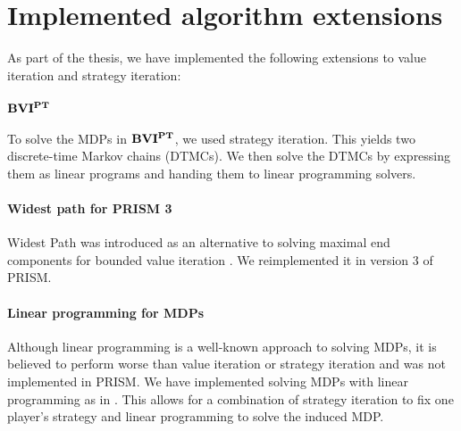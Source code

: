 \chapter{Implemented algorithm extensions} \label{ch:implementedAlgos}
As part of the thesis, we have implemented the following extensions to value iteration and strategy iteration:

\subsubsection*{$\mathbf{BVI^{PT}}$} To solve the MDPs in $\mathbf{BVI^{PT}}$, we used strategy iteration. This yields two discrete-time Markov chains (DTMCs).
We then solve the DTMCs by expressing them as linear programs and handing them to linear programming solvers.

\subsubsection*{Widest path for PRISM 3}
Widest Path was introduced as an alternative to solving maximal end components for bounded value iteration \cite{widestPath}.
We reimplemented it in version 3 of PRISM.

\subsubsection*{Linear programming for MDPs}
Although linear programming is a well-known approach to solving MDPs, it is believed to perform worse than value iteration or strategy iteration
and was not implemented in PRISM. We have implemented solving MDPs with linear programming as in \cite{Puterman}. 
This allows for a combination of strategy iteration to fix one player's strategy and linear programming to solve the induced MDP.
